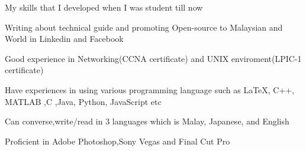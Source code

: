 

\begin{cventries}

  \cventry
    {My skills that I developed when I was student till now} %
    { }%
    {} %
    {} %
    {
      \begin{cvitems} %
        \item {Writing about technical guide and promoting Open-source to Malaysian and World in Linkedin and Facebook}
		\item {Good experience in Networking(CCNA certificate) and UNIX enviroment(LPIC-1 certificate) }
        \item {Have experiences in using various programming language such as \LaTeX , C++, MATLAB ,C ,Java, Python, JavaScript etc}
        \item {Can converse,write/read  in 3 languages which is Malay, Japanese, and English }
        \item {Proficient in Adobe Photoshop,Sony Vegas and Final Cut Pro}
      \end{cvitems}
    }

\end{cventries}
